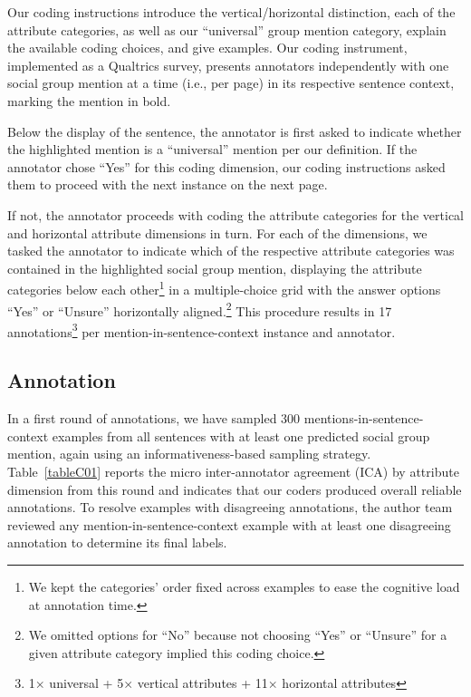 \documentclass[12pt]{article}
\begin{document}
Our coding instructions introduce the vertical/horizontal distinction, each of the attribute categories, as well as our ``universal'' group mention category, explain the available coding choices, and give examples.
Our coding instrument, implemented as a Qualtrics survey, presents annotators independently with one social group mention at a time (i.e., per page) in its respective sentence context, marking the mention in bold.

Below the display of the sentence, the annotator is first asked to indicate whether the highlighted mention is a ``universal'' mention per our definition.
If the annotator chose ``Yes'' for this coding dimension, our coding instructions asked them to proceed with the next instance on the next page.

If not, the annotator proceeds with coding the attribute categories for the vertical and horizontal attribute dimensions in turn.
For each of the dimensions, we tasked the annotator to indicate which of the respective attribute categories was contained in the highlighted social group mention, displaying the attribute categories below each other\footnote{We kept the categories' order fixed across examples to ease the cognitive load at annotation time.} in a multiple-choice grid with the answer options ``Yes'' or ``Unsure'' horizontally aligned.\footnote{We omitted options for ``No'' because not choosing ``Yes'' or ``Unsure'' for a given attribute category implied this coding choice.}
This procedure results in 17 annotations\footnote{1\(\times\) universal + 5\(\times\) vertical attributes + 11\(\times\) horizontal attributes} per mention-in-sentence-context instance and annotator.

\subsection{Annotation}\label{annotation-1}

In a first round of annotations, we have sampled 300 mentions-in-sentence-context examples from all sentences with at least one predicted social group mention, again using an informativeness-based sampling strategy.
Table~\ref{tableC01} reports the micro inter-annotator agreement (ICA) by attribute dimension from this round and indicates that our coders produced overall reliable annotations.
To resolve examples with disagreeing annotations, the author team reviewed any mention-in-sentence-context example with at least one disagreeing annotation to determine its final labels.
\end{document}
